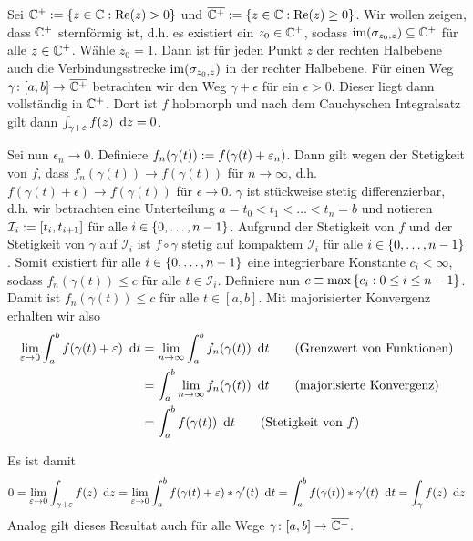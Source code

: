 \begin{exercisePage}
	\pagebreak

	Sei $\mathbb{C}^+ \mathrel{:=} \left\{ z \in \mathbb{C} : \operatorname{Re}(z) > 0 \right\}$ und $\overline{\mathbb{C}^+} \mathrel{:=} \left\{ z \in \mathbb{C} : \operatorname{Re}(z) \ge 0 \right\}$. Wir wollen zeigen, dass $\mathbb{C}^+$ sternförmig ist, d.h. es existiert ein $z_0 \in \mathbb{C}^+$, sodass $\operatorname{im}(\sigma_{z_0,z}) \subseteq \mathbb{C}^+$ für alle $z \in \mathbb{C}^+$. Wähle $z_0 = 1$. Dann ist für jeden Punkt $z$ der rechten Halbebene auch die Verbindungsstrecke $\operatorname{im}(\sigma_{z_0, z})$ in der rechter Halbebene. Für einen Weg $\abb{\gamma}{[a,b]}{\quer{\CC^+}}$ betrachten wir den Weg $\gamma + \epsilon$ für ein $\epsilon > 0$. Dieser liegt dann vollständig in $\mathbb{C}^+$. Dort ist $f$ holomorph und nach dem Cauchyschen Integralsatz gilt dann $\int_{\gamma + \varepsilon} f(z) \enskip \mathrm{d}z = 0$. 
	
	Sei nun $\epsilon_n \to 0$. Definiere $f_n(\gamma(t)) \mathrel{:=} f(\gamma(t) + \varepsilon_n)$. Dann gilt wegen der Stetigkeit von $f$, dass $f_n(\gamma(t)) \to f(\gamma(t))$ für $n \to \infty$, d.h. $f(\gamma(t) + \epsilon) \to f(\gamma(t))$ für $\epsilon \to 0$.
	$\gamma$ ist stückweise stetig differenzierbar, d.h. wir betrachten eine Unterteilung $a = t_0 < t_1 < \dots < t_n = b$ und notieren $\mathcal{I}_i \mathrel{:=} [t_i, t_{i+1}]$ für alle $i \in \left\{ 0, \dots, n-1 \right\}$. Aufgrund der Stetigkeit von $f$ und der Stetigkeit von $\gamma$ auf $\mathcal{I}_i$ ist $f \circ \gamma$ stetig auf kompaktem $\mathcal{I}_i$ für alle $i \in \left\{ 0, \dots, n-1 \right\}$. Somit existiert für alle $i \in \left\{ 0, \dots, n-1 \right\}$ eine integrierbare Konstante $c_i < \infty$, sodass $f_n(\gamma(t)) \le c$ für alle $t \in \mathcal{I}_i$. Definiere nun $c \equiv \max\left\{ c_i : 0 \le i \le n-1 \right\}$. Damit ist $f_n(\gamma(t)) \le c$ für alle $t \in [a,b]$. Mit majorisierter Konvergenz erhalten wir also
	\begin{align*}
		\lim_{\varepsilon \to 0} \int_a^b f(\gamma(t) + \varepsilon) \enskip \mathrm{d}t
		&= \lim_{n \to \infty} \int_a^b f_n(\gamma(t)) \enskip \mathrm{d}t \tag{Grenzwert von Funktionen} \\
		&= \int_a^b \lim_{n \to \infty} f_n(\gamma(t)) \enskip \mathrm{d}t \tag{majorisierte Konvergenz}\\
		&= \int_a^b f(\gamma(t)) \enskip \mathrm{d}t \tag{Stetigkeit von $f$}
	\end{align*}
	
	Es ist damit
	\begin{align*}
			0 = \lim_{\varepsilon \to 0} \int_{\gamma + \varepsilon} f(z) \enskip \mathrm{d}z 
			= \lim_{\varepsilon \to 0} \int_a^b f(\gamma(t) + \varepsilon) * \gamma'(t) \enskip \mathrm{d}t 
			= \int_a^b f(\gamma(t)) * \gamma'(t) \enskip \mathrm{d}t 
			= \int_\gamma f(z) \enskip \mathrm{d}z
	\end{align*}
	Analog gilt dieses Resultat auch für alle Wege $\abb{\gamma}{[a,b]}{\quer{\CC^-}}$.
	

\end{exercisePage}
